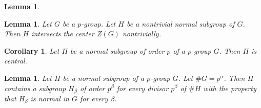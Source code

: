 \documentclass{dcthesis}
\numberwithin{equation}{section}
\newtheorem{lemma}[equation]{Lemma}
\newtheorem{corr}[equation]{Corollary}
\theoremstyle{definition}
\theoremstyle{remark}
\begin{document}
{{{\begin{lemma}
    \end{lemma}
    \begin{lemma}
      \label{lem:normalimpliescentralintersect}
      Let $G$ be a $p$-group.
      Let $H$ be a nontrivial normal subgroup of $G$.
      Then $H$ intersects the center $Z(G)$ nontrivially.
    \end{lemma}
    \begin{corr}
      \label{cor:normalcentral}
      Let $H$ be a normal subgroup of order $p$ of a $p$-group $G$.
      Then $H$ is central.
    \end{corr}
    \begin{lemma}
      \label{lem:normalsubgroupsofallorders}
      Let $H$ be a normal subgroup of a $p$-group $G$.
      Let $\#G=p^\alpha$.
      Then $H$ contains a subgroup $H_\beta$ of order $p^\beta$
      for every divisor $p^\beta$ of $\#H$
      with the property that
      $H_\beta$ is normal in $G$ for every $\beta$.

\end{lemma}}}}
\end{document}
